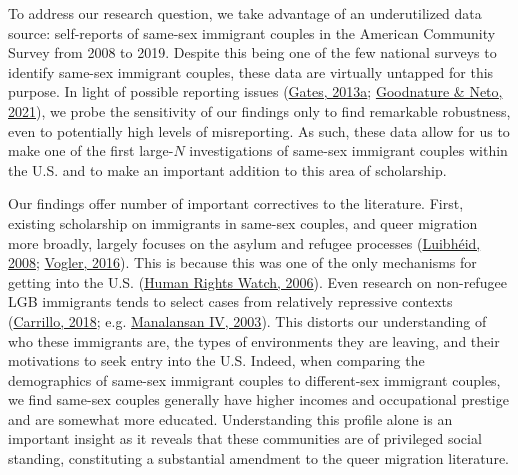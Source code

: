 \documentclass[
  11pt,
]{article}
\begin{document}
To address our research question, we take advantage of an underutilized data source: self-reports of same-sex immigrant couples in the American Community Survey from 2008 to 2019. Despite this being one of the few national surveys to identify same-sex immigrant couples, these data are virtually untapped for this purpose. In light of possible reporting issues (\protect\hyperlink{ref-gates_2013}{Gates, 2013a}; \protect\hyperlink{ref-goodnature_2021}{Goodnature \& Neto, 2021}), we probe the sensitivity of our findings only to find remarkable robustness, even to potentially high levels of misreporting. As such, these data allow for us to make one of the first large-\(N\) investigations of same-sex immigrant couples within the U.S. and to make an important addition to this area of scholarship.

Our findings offer number of important correctives to the literature. First, existing scholarship on immigrants in same-sex couples, and queer migration more broadly, largely focuses on the asylum and refugee processes (\protect\hyperlink{ref-luibheid_2008}{Luibhéid, 2008}; \protect\hyperlink{ref-vogler_2016}{Vogler, 2016}). This is because this was one of the only mechanisms for getting into the U.S. (\protect\hyperlink{ref-humanrightswatch_2006}{Human Rights Watch, 2006}). Even research on non-refugee LGB immigrants tends to select cases from relatively repressive contexts (\protect\hyperlink{ref-carrillo_2018}{Carrillo, 2018}; e.g. \protect\hyperlink{ref-manalansaniv_2003}{Manalansan IV, 2003}). This distorts our understanding of who these immigrants are, the types of environments they are leaving, and their motivations to seek entry into the U.S. Indeed, when comparing the demographics of same-sex immigrant couples to different-sex immigrant couples, we find same-sex couples generally have higher incomes and occupational prestige and are somewhat more educated. Understanding this profile alone is an important insight as it reveals that these communities are of privileged social standing, constituting a substantial amendment to the queer migration literature.
\end{document}
